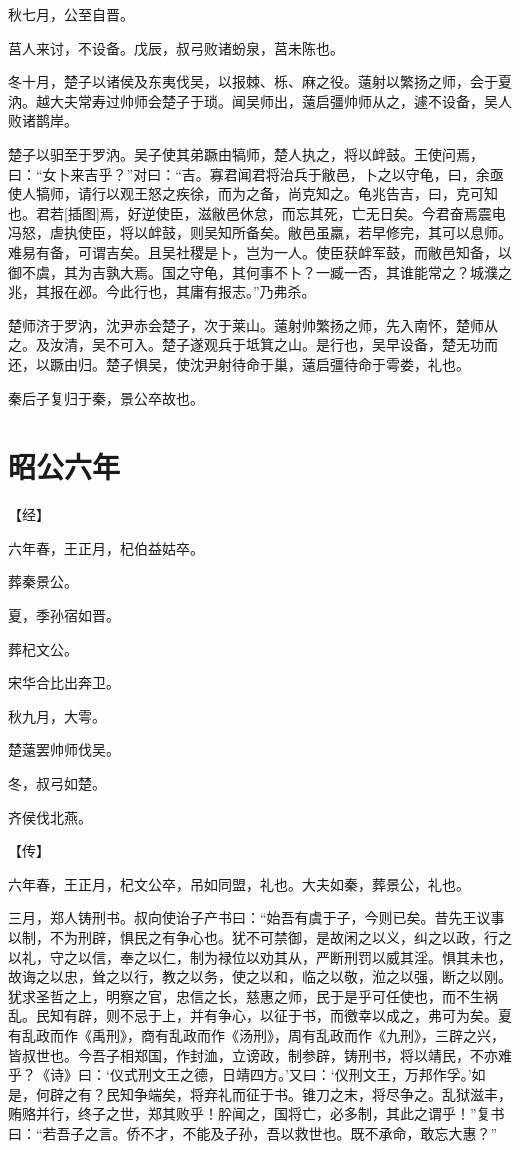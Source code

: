\documentclass[a4paper,12pt,UTF8,twoside]{ctexbook}
\begin{document}
秋七月，公至自晋。

莒人来讨，不设备。戊辰，叔弓败诸蚡泉，莒未陈也。

冬十月，楚子以诸侯及东夷伐吴，以报棘、栎、麻之役。薳射以繁扬之师，会于夏汭。越大夫常寿过帅师会楚子于琐。闻吴师出，薳启彊帅师从之，遽不设备，吴人败诸鹊岸。

楚子以驲至于罗汭。吴子使其弟蹶由犒师，楚人执之，将以衅鼓。王使问焉，曰：“女卜来吉乎？”对曰：“吉。寡君闻君将治兵于敝邑，卜之以守龟，曰，余亟使人犒师，请行以观王怒之疾徐，而为之备，尚克知之。龟兆告吉，曰，克可知也。君若[插图]焉，好逆使臣，滋敝邑休怠，而忘其死，亡无日矣。今君奋焉震电冯怒，虐执使臣，将以衅鼓，则吴知所备矣。敝邑虽羸，若早修完，其可以息师。难易有备，可谓吉矣。且吴社稷是卜，岂为一人。使臣获衅军鼓，而敝邑知备，以御不虞，其为吉孰大焉。国之守龟，其何事不卜？一臧一否，其谁能常之？城濮之兆，其报在邲。今此行也，其庸有报志。”乃弗杀。

楚师济于罗汭，沈尹赤会楚子，次于莱山。薳射帅繁扬之师，先入南怀，楚师从之。及汝清，吴不可入。楚子遂观兵于坻箕之山。是行也，吴早设备，楚无功而还，以蹶由归。楚子惧吴，使沈尹射待命于巢，薳启彊待命于雩娄，礼也。

秦后子复归于秦，景公卒故也。


\chapter{昭公六年}


【经】

六年春，王正月，杞伯益姑卒。

葬秦景公。

夏，季孙宿如晋。

葬杞文公。

宋华合比出奔卫。

秋九月，大雩。

楚薳罢帅师伐吴。

冬，叔弓如楚。

齐侯伐北燕。

【传】

六年春，王正月，杞文公卒，吊如同盟，礼也。大夫如秦，葬景公，礼也。

三月，郑人铸刑书。叔向使诒子产书曰：“始吾有虞于子，今则已矣。昔先王议事以制，不为刑辟，惧民之有争心也。犹不可禁御，是故闲之以义，纠之以政，行之以礼，守之以信，奉之以仁，制为禄位以劝其从，严断刑罚以威其淫。惧其未也，故诲之以忠，耸之以行，教之以务，使之以和，临之以敬，涖之以强，断之以刚。犹求圣哲之上，明察之官，忠信之长，慈惠之师，民于是乎可任使也，而不生祸乱。民知有辟，则不忌于上，并有争心，以征于书，而徼幸以成之，弗可为矣。夏有乱政而作《禹刑》，商有乱政而作《汤刑》，周有乱政而作《九刑》，三辟之兴，皆叔世也。今吾子相郑国，作封洫，立谤政，制参辟，铸刑书，将以靖民，不亦难乎？《诗》曰：‘仪式刑文王之德，日靖四方。’又曰：‘仪刑文王，万邦作孚。’如是，何辟之有？民知争端矣，将弃礼而征于书。锥刀之末，将尽争之。乱狱滋丰，贿赂并行，终子之世，郑其败乎！肸闻之，国将亡，必多制，其此之谓乎！”复书曰：“若吾子之言。侨不才，不能及子孙，吾以救世也。既不承命，敢忘大惠？”
\end{document}
